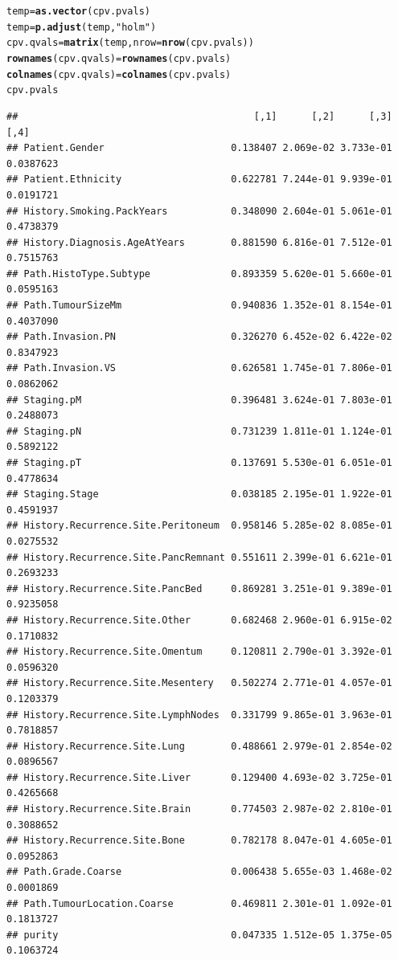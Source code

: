 \documentclass{article}\usepackage[]{graphicx}\usepackage[]{color}
\makeatletter
\newcommand{\hlstr}[1]{\textcolor[rgb]{0.192,0.494,0.8}{#1}}%
\newcommand{\hlstd}[1]{\textcolor[rgb]{0.345,0.345,0.345}{#1}}%
\newcommand{\hlkwb}[1]{\textcolor[rgb]{0.69,0.353,0.396}{#1}}%
\newcommand{\hlkwc}[1]{\textcolor[rgb]{0.333,0.667,0.333}{#1}}%
\newcommand{\hlkwd}[1]{\textcolor[rgb]{0.737,0.353,0.396}{\textbf{#1}}}%
\newenvironment{kframe}{%
 \def\at@end@of@kframe{}%
 \ifinner\ifhmode%
  \def\at@end@of@kframe{\end{minipage}}%
  \begin{minipage}{\columnwidth}%
 \fi\fi%
 \def\FrameCommand##1{\hskip\@totalleftmargin \hskip-\fboxsep
 \colorbox{shadecolor}{##1}\hskip-\fboxsep
     \hskip-\linewidth \hskip-\@totalleftmargin \hskip\columnwidth}%
 \MakeFramed {\advance\hsize-\width
   \@totalleftmargin\z@ \linewidth\hsize
   \@setminipage}}%
 {\par\unskip\endMakeFramed%
 \at@end@of@kframe}
\newenvironment{knitrout}{}{} %
\makeatother
\begin{document}
\begin{knitrout}
\begin{kframe}
\begin{alltt}
\hlstd{temp} \hlkwb{=} \hlkwd{as.vector}\hlstd{(cpv.pvals)}
\hlstd{temp} \hlkwb{=} \hlkwd{p.adjust}\hlstd{(temp,} \hlstr{"holm"}\hlstd{)}
\hlstd{cpv.qvals} \hlkwb{=} \hlkwd{matrix}\hlstd{(temp,} \hlkwc{nrow} \hlstd{=} \hlkwd{nrow}\hlstd{(cpv.pvals))}
\hlkwd{rownames}\hlstd{(cpv.qvals)} \hlkwb{=} \hlkwd{rownames}\hlstd{(cpv.pvals)}
\hlkwd{colnames}\hlstd{(cpv.qvals)} \hlkwb{=} \hlkwd{colnames}\hlstd{(cpv.pvals)}
\hlstd{cpv.pvals}
\end{alltt}
\begin{verbatim}
##                                         [,1]      [,2]      [,3]      [,4]
## Patient.Gender                      0.138407 2.069e-02 3.733e-01 0.0387623
## Patient.Ethnicity                   0.622781 7.244e-01 9.939e-01 0.0191721
## History.Smoking.PackYears           0.348090 2.604e-01 5.061e-01 0.4738379
## History.Diagnosis.AgeAtYears        0.881590 6.816e-01 7.512e-01 0.7515763
## Path.HistoType.Subtype              0.893359 5.620e-01 5.660e-01 0.0595163
## Path.TumourSizeMm                   0.940836 1.352e-01 8.154e-01 0.4037090
## Path.Invasion.PN                    0.326270 6.452e-02 6.422e-02 0.8347923
## Path.Invasion.VS                    0.626581 1.745e-01 7.806e-01 0.0862062
## Staging.pM                          0.396481 3.624e-01 7.803e-01 0.2488073
## Staging.pN                          0.731239 1.811e-01 1.124e-01 0.5892122
## Staging.pT                          0.137691 5.530e-01 6.051e-01 0.4778634
## Staging.Stage                       0.038185 2.195e-01 1.922e-01 0.4591937
## History.Recurrence.Site.Peritoneum  0.958146 5.285e-02 8.085e-01 0.0275532
## History.Recurrence.Site.PancRemnant 0.551611 2.399e-01 6.621e-01 0.2693233
## History.Recurrence.Site.PancBed     0.869281 3.251e-01 9.389e-01 0.9235058
## History.Recurrence.Site.Other       0.682468 2.960e-01 6.915e-02 0.1710832
## History.Recurrence.Site.Omentum     0.120811 2.790e-01 3.392e-01 0.0596320
## History.Recurrence.Site.Mesentery   0.502274 2.771e-01 4.057e-01 0.1203379
## History.Recurrence.Site.LymphNodes  0.331799 9.865e-01 3.963e-01 0.7818857
## History.Recurrence.Site.Lung        0.488661 2.979e-01 2.854e-02 0.0896567
## History.Recurrence.Site.Liver       0.129400 4.693e-02 3.725e-01 0.4265668
## History.Recurrence.Site.Brain       0.774503 2.987e-02 2.810e-01 0.3088652
## History.Recurrence.Site.Bone        0.782178 8.047e-01 4.605e-01 0.0952863
## Path.Grade.Coarse                   0.006438 5.655e-03 1.468e-02 0.0001869
## Path.TumourLocation.Coarse          0.469811 2.301e-01 1.092e-01 0.1813727
## purity                              0.047335 1.512e-05 1.375e-05 0.1063724

\end{verbatim}
\end{kframe}
\end{knitrout}
\end{document}
